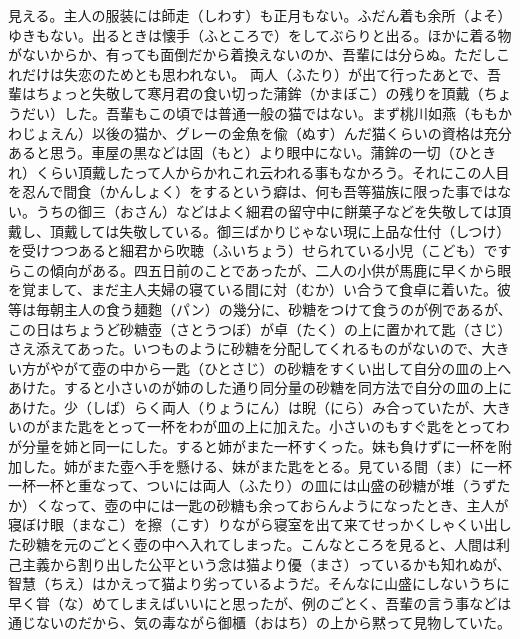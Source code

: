 \documentclass{book}
\begin{document}
見える。主人の服装には師走（しわす）も正月もない。ふだん着も余所（よそ）ゆきもない。出るときは懐手（ふところで）をしてぶらりと出る。ほかに着る物がないからか、有っても面倒だから着換えないのか、吾輩には分らぬ。ただしこれだけは失恋のためとも思われない。
両人（ふたり）が出て行ったあとで、吾輩はちょっと失敬して寒月君の食い切った蒲鉾（かまぼこ）の残りを頂戴（ちょうだい）した。吾輩もこの頃では普通一般の猫ではない。まず桃川如燕（ももかわじょえん）以後の猫か、グレーの金魚を偸（ぬす）んだ猫くらいの資格は充分あると思う。車屋の黒などは固（もと）より眼中にない。蒲鉾の一切（ひときれ）くらい頂戴したって人からかれこれ云われる事もなかろう。それにこの人目を忍んで間食（かんしょく）をするという癖は、何も吾等猫族に限った事ではない。うちの御三（おさん）などはよく細君の留守中に餅菓子などを失敬しては頂戴し、頂戴しては失敬している。御三ばかりじゃない現に上品な仕付（しつけ）を受けつつあると細君から吹聴（ふいちょう）せられている小児（こども）ですらこの傾向がある。四五日前のことであったが、二人の小供が馬鹿に早くから眼を覚まして、まだ主人夫婦の寝ている間に対（むか）い合うて食卓に着いた。彼等は毎朝主人の食う麺麭（パン）の幾分に、砂糖をつけて食うのが例であるが、この日はちょうど砂糖壺（さとうつぼ）が卓（たく）の上に置かれて匙（さじ）さえ添えてあった。いつものように砂糖を分配してくれるものがないので、大きい方がやがて壺の中から一匙（ひとさじ）の砂糖をすくい出して自分の皿の上へあけた。すると小さいのが姉のした通り同分量の砂糖を同方法で自分の皿の上にあけた。少（しば）らく両人（りょうにん）は睨（にら）み合っていたが、大きいのがまた匙をとって一杯をわが皿の上に加えた。小さいのもすぐ匙をとってわが分量を姉と同一にした。すると姉がまた一杯すくった。妹も負けずに一杯を附加した。姉がまた壺へ手を懸ける、妹がまた匙をとる。見ている間（ま）に一杯一杯一杯と重なって、ついには両人（ふたり）の皿には山盛の砂糖が堆（うずたか）くなって、壺の中には一匙の砂糖も余っておらんようになったとき、主人が寝ぼけ眼（まなこ）を擦（こす）りながら寝室を出て来てせっかくしゃくい出した砂糖を元のごとく壺の中へ入れてしまった。こんなところを見ると、人間は利己主義から割り出した公平という念は猫より優（まさ）っているかも知れぬが、智慧（ちえ）はかえって猫より劣っているようだ。そんなに山盛にしないうちに早く甞（な）めてしまえばいいにと思ったが、例のごとく、吾輩の言う事などは通じないのだから、気の毒ながら御櫃（おはち）の上から黙って見物していた。
\end{document}
